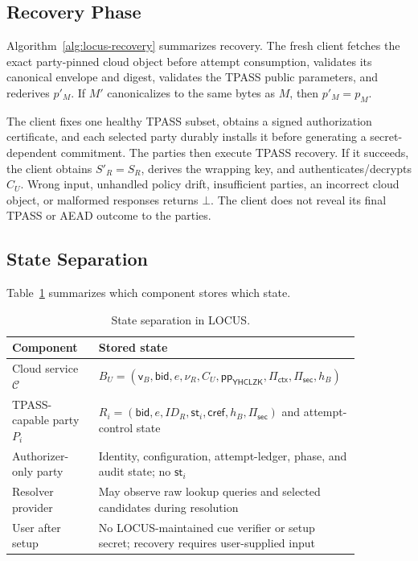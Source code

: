 \documentclass[sigconf,anonymous]{acmart}
\newcommand{\LOCUS}{\textsf{LOCUS}}
\newcommand{\YHCLZK}{\mathsf{YHCLZK}}
\begin{document}
\subsection{Recovery Phase}

Algorithm~\ref{alg:locus-recovery} summarizes recovery. The fresh client fetches
the exact party-pinned cloud object before attempt consumption, validates its
canonical envelope and digest, validates the TPASS public parameters, and
rederives \(p'_M\). If \(M'\) canonicalizes to the same bytes as \(M\), then
\(p'_M=p_M\).

The client fixes one healthy TPASS subset, obtains a signed authorization
certificate, and each selected party durably installs it before generating a
secret-dependent commitment. The parties then execute TPASS recovery. If it
succeeds, the client obtains \(S'_R=S_R\), derives the wrapping key, and
authenticates/decrypts \(C_U\). Wrong input, unhandled policy drift, insufficient
parties, an incorrect cloud object, or malformed responses returns \(\bot\). The
client does not reveal its final TPASS or AEAD outcome to the parties.

\subsection{State Separation}

Table~\ref{tab:locus-state} summarizes which component stores which state.

\begin{table}[t]
\centering
\caption{State separation in \LOCUS.}
\label{tab:locus-state}
\footnotesize
\begin{tabular}{p{0.24\linewidth}p{0.62\linewidth}}
\toprule
\textbf{Component} & \textbf{Stored state} \\
\midrule
Cloud service \(\mathcal{C}\) &
\(B_U=(\mathsf{v}_B,\mathsf{bid},e,\nu_R,C_U,\mathsf{pp}_{\YHCLZK},\Pi_{\mathsf{ctx}},\Pi_{\mathsf{sec}},h_B)\) \\
\addlinespace
TPASS-capable party \(P_i\) &
\(R_i=(\mathsf{bid},e,ID_R,\mathsf{st}_i,\mathsf{cref},h_B,\Pi_{\mathsf{sec}})\) and attempt-control state \\
\addlinespace
Authorizer-only party &
Identity, configuration, attempt-ledger, phase, and audit state; no \(\mathsf{st}_i\) \\
\addlinespace
Resolver provider &
May observe raw lookup queries and selected candidates during resolution \\
\addlinespace
User after setup &
No LOCUS-maintained cue verifier or setup secret; recovery requires user-supplied input \\
\bottomrule
\end{tabular}
\end{table}
\end{document}

